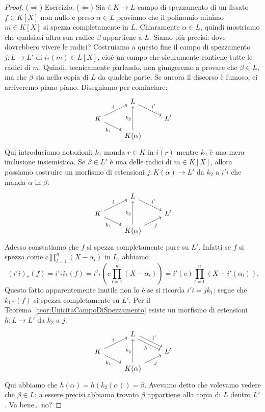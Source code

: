 \begin{proof}%
(\(\Rightarrow\)) Esercizio.\newline
(\(\Leftarrow\)) Sia \(i : K \to L\) campo di spezzamento di un fissato \(f \in K[X]\) non nullo e preso \(\alpha \in L\) proviamo che il polinomio minimo \(m \in K[X]\) si spezza completamente in \(L\). Chiaramente \(\alpha \in L\), quindi mostriamo che qualsiasi altra sua radice \(\beta\) appartiene a \(L\). Siamo più precisi: dove dovrebbero vivere le radici? Costruiamo a questo fine il campo di spezzamento \(j : L \to L'\) di \(i_\ast(m) \in L[X]\), cioè un campo che sicuramente contiene tutte le radici di \(m\). Quindi, tecnicamente parlando, non giungeremo a provare che \(\beta \in L\), ma che \(\beta\) sta nella copia di \(L\) da qualche parte. Se ancora il discorso è fumoso, ci arriveremo piano piano. Disegniamo per cominciare:
\[\begin{tikzcd}[row sep=small]
& L \ar["{i'}", dr] \\
K \ar["i", ur] \ar["{k_1}", dr, swap] &  & L' \\
& K(\alpha) \ar["{k_2}", uu]
\end{tikzcd}\]
Qui introduciamo notazioni: \(k_1\) manda \(r \in K\) in \(i(r)\) mentre \(k_2\) è una mera inclusione insiemistica. Se \(\beta \in L'\) è una delle radici di \(m \in K[X]\), allora possiamo costruire un morfismo di estensioni \(j : K(\alpha) \to L'\) da \(k_2\) a \(i'i\) che manda \(\alpha\) in \(\beta\):
\[\begin{tikzcd}[row sep=small]
& L \ar["{i'}", dr] \\
K \ar["i", ur] \ar["{k_1}", dr, swap] &  & L' \\
& K(\alpha) \ar["{k_2}", uu] \ar["j", ur, swap]
\end{tikzcd}\]
Adesso constatiamo che \(f\) si spezza completamente pure su \(L'\). Infatti se \(f\) si spezza come \(c \prod_{l = 1}^n (X-\alpha_l)\) in \(L\), abbiamo
\[\left(i'i\right)_\ast (f) = i'_\ast i_\ast (f) = i'_\ast \left(c \prod_{l = 1}^n (X-\alpha_l)\right) = i'(c) \prod_{l = 1}^n \left(X-i'(\alpha_l)\right) .\]
Questo fatto apparentemente inutile non lo è se si ricorda \(i'i = jk_1\): segue che \(k_{1\ast} (f)\) si spezza completamente su \(L'\). Per il Teorema~\ref{teor:UnicitaCampoDiSpezzamento} esiste un morfismo di estensioni \(h : L \to L'\) da \(k_2\) a \(j\).
\[\begin{tikzcd}[row sep=small]
& L \ar["{i'}", dr, shift left] \ar["h", dr, shift right, swap] \\
K \ar["i", ur] \ar["{k_1}", dr, swap] &  & L' \\
& K(\alpha) \ar["{k_2}", uu] \ar["j", ur, swap]
\end{tikzcd}\]
Qui abbiamo che \(h(\alpha) = h\left(k_2 (\alpha)\right) = \beta\). Avevamo detto che volevamo vedere che \(\beta \in L\): a essere precisi abbiamo trovato \(\beta\) appartiene alla copia di \(L\) dentro \(L'\). Va bene\dots{} no?
\end{proof}

